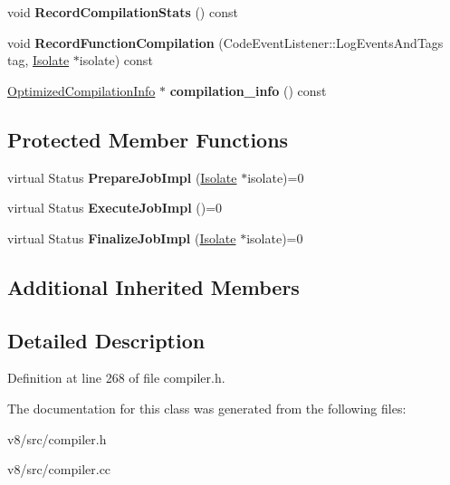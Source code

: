 \begin{DoxyCompactItemize}
\item 
\mbox{\label{classv8_1_1internal_1_1OptimizedCompilationJob_abe31fe38c5e3300f7be34c6fc59e8c02}} 
void {\bfseries Record\+Compilation\+Stats} () const
\item 
\mbox{\label{classv8_1_1internal_1_1OptimizedCompilationJob_aa4c753b98a61d808c9e389f30ca327e2}} 
void {\bfseries Record\+Function\+Compilation} (Code\+Event\+Listener\+::\+Log\+Events\+And\+Tags tag, \mbox{\hyperlink{classv8_1_1internal_1_1Isolate}{Isolate}} $\ast$isolate) const
\item 
\mbox{\label{classv8_1_1internal_1_1OptimizedCompilationJob_a744a06b5099b092ffa58cc204acdef47}} 
\mbox{\hyperlink{classv8_1_1internal_1_1OptimizedCompilationInfo}{Optimized\+Compilation\+Info}} $\ast$ {\bfseries compilation\+\_\+info} () const
\end{DoxyCompactItemize}
\subsection*{Protected Member Functions}
\begin{DoxyCompactItemize}
\item 
\mbox{\label{classv8_1_1internal_1_1OptimizedCompilationJob_a8a6e63ebb0edceb14d0e5e65d00c471e}} 
virtual Status {\bfseries Prepare\+Job\+Impl} (\mbox{\hyperlink{classv8_1_1internal_1_1Isolate}{Isolate}} $\ast$isolate)=0
\item 
\mbox{\label{classv8_1_1internal_1_1OptimizedCompilationJob_ad15d328c562fbd63bdef62a33874d441}} 
virtual Status {\bfseries Execute\+Job\+Impl} ()=0
\item 
\mbox{\label{classv8_1_1internal_1_1OptimizedCompilationJob_a9979ecba5735dc7a38fd9fa063a3b358}} 
virtual Status {\bfseries Finalize\+Job\+Impl} (\mbox{\hyperlink{classv8_1_1internal_1_1Isolate}{Isolate}} $\ast$isolate)=0
\end{DoxyCompactItemize}
\subsection*{Additional Inherited Members}


\subsection{Detailed Description}


Definition at line 268 of file compiler.\+h.



The documentation for this class was generated from the following files\+:\begin{DoxyCompactItemize}
\item 
v8/src/compiler.\+h\item 
v8/src/compiler.\+cc\end{DoxyCompactItemize}
